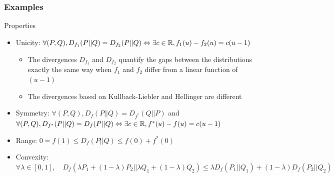\documentclass[8pt]{beamer}
\begin{document}
\begin{frame}
  \frametitle{Examples}
\begin{block}{Properties}
  \begin{itemize}
  \item Unicity: $\forall (P,Q), D_{f_1}(P||Q)=D_{f_2}(P||Q) \Leftrightarrow \exists c\in{\mathbb R}, f_1(u)-f_2(u)=c(u-1)$ 
  \begin{itemize}
  \item The divergences $D_{f_1}$ and $D_{f_2}$  quantify the gaps between the distributions  exactly the same way when  $f_1$ and $f_2$ differ from a linear function of $(u-1)$
  \item The divergences based on Kullback-Liebler and Hellinger are different
  \end{itemize}
  \item Symmetry: $\forall (P,Q), D_{f}(P||Q)=D_{f^*}(Q||P)$ and $\forall (P,Q),D_{f^*}(P||Q)=D_{f}(P||Q)\Leftrightarrow \exists c\in{\mathbb R}, f^*(u)-f(u)=c(u-1)$
  \item Range: \alert{$\displaystyle 0=f(1)\leq D_f(P||Q)\leq f(0)+f^*(0)$}
  \item Convexity: $\displaystyle \forall \lambda\in[0,1],\quad D_f(\lambda P_1+(1-\lambda)P_2||\lambda Q_1+(1-\lambda)Q_2)\leq\lambda D_f(P_1||Q_1)+(1-\lambda)D_f(P_2||Q_2)$
  \end{itemize}
  \end{block}

  \end{frame}
\end{document}
